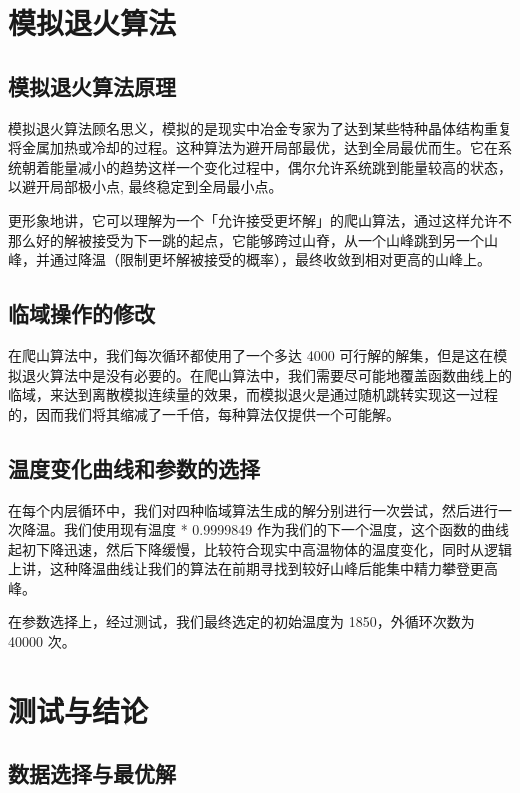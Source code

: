 \section{模拟退火算法}

\subsection{模拟退火算法原理}

模拟退火算法顾名思义，模拟的是现实中冶金专家为了达到某些特种晶体结构重复将金属加热或冷却的过程。这种算法为避开局部最优，达到全局最优而生。它在系统朝着能量减小的趋势这样一个变化过程中，偶尔允许系统跳到能量较高的状态，以避开局部极小点, 最终稳定到全局最小点。

更形象地讲，它可以理解为一个「允许接受更坏解」的爬山算法，通过这样允许不那么好的解被接受为下一跳的起点，它能够跨过山脊，从一个山峰跳到另一个山峰，并通过降温（限制更坏解被接受的概率），最终收敛到相对更高的山峰上。

\subsection{临域操作的修改}

在爬山算法中，我们每次循环都使用了一个多达 4000 可行解的解集，但是这在模拟退火算法中是没有必要的。在爬山算法中，我们需要尽可能地覆盖函数曲线上的临域，来达到离散模拟连续量的效果，而模拟退火是通过随机跳转实现这一过程的，因而我们将其缩减了一千倍，每种算法仅提供一个可能解。

\subsection{温度变化曲线和参数的选择}

在每个内层循环中，我们对四种临域算法生成的解分别进行一次尝试，然后进行一次降温。我们使用现有温度 * 0.9999849 作为我们的下一个温度，这个函数的曲线起初下降迅速，然后下降缓慢，比较符合现实中高温物体的温度变化，同时从逻辑上讲，这种降温曲线让我们的算法在前期寻找到较好山峰后能集中精力攀登更高峰。

在参数选择上，经过测试，我们最终选定的初始温度为 1850，外循环次数为 40000 次。

\section{测试与结论}

\subsection{数据选择与最优解}

